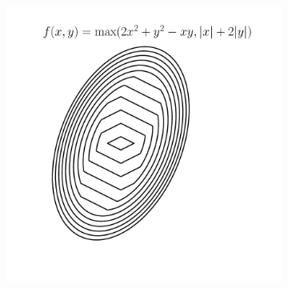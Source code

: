 \begin{figure}[t]
\begin{subfigure}{0.325\textwidth}
\caption{}
\end{subfigure}
\begin{subfigure}{0.325\textwidth}
\includegraphics[height=1.02\linewidth]{ebookML_src/src/convexity/max_2d.pdf}
\caption{}
\end{subfigure}


\end{figure}
